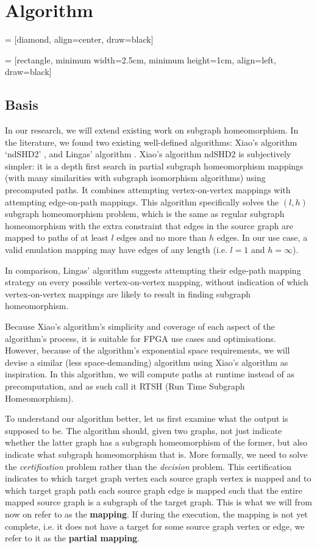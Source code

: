 \chapter{Algorithm}
\label{chapter:algorithm}

 = [diamond, align=center, draw=black]

 = [rectangle, minimum width=2.5cm, minimum height=1cm, align=left, draw=black]


\section{Basis}
In our research, we will extend existing work on subgraph homeomorphism. In the literature, we found two existing well-defined algorithms: Xiao's algorithm `ndSHD2' \cite{XIAONODEDISJOINT}, and Lingas' algorithm \cite{LINGAS2009464}. Xiao's algorithm ndSHD2 is subjectively simpler: it is a depth first search in partial subgraph homeomorphism mappings (with many similarities with subgraph isomorphism algorithms) using precomputed paths. It combines attempting vertex-on-vertex mappings with attempting edge-on-path mappings. This algorithm specifically solves the $(l,h)$ subgraph homeomorphism problem, which is the same as regular subgraph homeomorphism with the extra constraint that edges in the source graph are mapped to paths of at least $l$ edges and no more than $h$ edges. In our use case, a valid emulation mapping may have edges of any length (i.e. $l=1$ and $h=\infty$). 

In comparison, Lingas' algorithm suggests attempting their edge-path mapping strategy on every possible vertex-on-vertex mapping, without indication of which vertex-on-vertex mappings are likely to result in finding subgraph homeomorphism.

Because Xiao's algorithm's simplicity and coverage of each aspect of the algorithm's process, it is suitable for FPGA use cases and optimisations. However, because of the algorithm's exponential space requirements, we will devise a similar (less space-demanding) algorithm using Xiao's algorithm as inspiration. In this algorithm, we will compute paths at runtime instead of as precomputation, and as such call it RTSH (Run Time Subgraph Homeomorphism).

To understand our algorithm better, let us first examine what the output is supposed to be. The algorithm should, given two graphs, not just indicate whether the latter graph has a subgraph homeomorphism of the former, but also indicate what subgraph homeomorphism that is. More formally, we need to solve the \textit{certification} problem rather than the \textit{decision} problem. This certification indicates to which target graph vertex each source graph vertex is mapped and to which target graph path each source graph edge is mapped such that the entire mapped source graph is a subgraph of the target graph. This is what we will from now on refer to as the \textbf{mapping}. If during the execution, the mapping is not yet complete, i.e. it does not have a target for some source graph vertex or edge, we refer to it as the \textbf{partial mapping}.

